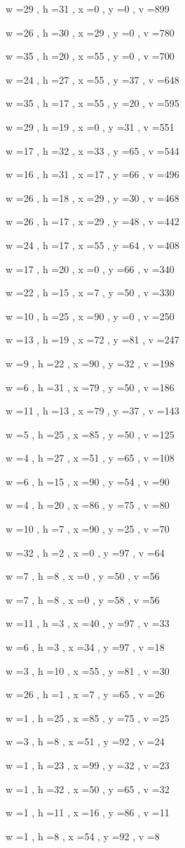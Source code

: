 \documentclass[11pt]{article}
\begin{document}
w =29 , h =31 , x =0 , y =0 , v =899
\par
w =26 , h =30 , x =29 , y =0 , v =780
\par
w =35 , h =20 , x =55 , y =0 , v =700
\par
w =24 , h =27 , x =55 , y =37 , v =648
\par
w =35 , h =17 , x =55 , y =20 , v =595
\par
w =29 , h =19 , x =0 , y =31 , v =551
\par
w =17 , h =32 , x =33 , y =65 , v =544
\par
w =16 , h =31 , x =17 , y =66 , v =496
\par
w =26 , h =18 , x =29 , y =30 , v =468
\par
w =26 , h =17 , x =29 , y =48 , v =442
\par
w =24 , h =17 , x =55 , y =64 , v =408
\par
w =17 , h =20 , x =0 , y =66 , v =340
\par
w =22 , h =15 , x =7 , y =50 , v =330
\par
w =10 , h =25 , x =90 , y =0 , v =250
\par
w =13 , h =19 , x =72 , y =81 , v =247
\par
w =9 , h =22 , x =90 , y =32 , v =198
\par
w =6 , h =31 , x =79 , y =50 , v =186
\par
w =11 , h =13 , x =79 , y =37 , v =143
\par
w =5 , h =25 , x =85 , y =50 , v =125
\par
w =4 , h =27 , x =51 , y =65 , v =108
\par
w =6 , h =15 , x =90 , y =54 , v =90
\par
w =4 , h =20 , x =86 , y =75 , v =80
\par
w =10 , h =7 , x =90 , y =25 , v =70
\par
w =32 , h =2 , x =0 , y =97 , v =64
\par
w =7 , h =8 , x =0 , y =50 , v =56
\par
w =7 , h =8 , x =0 , y =58 , v =56
\par
w =11 , h =3 , x =40 , y =97 , v =33
\par
w =6 , h =3 , x =34 , y =97 , v =18
\par
w =3 , h =10 , x =55 , y =81 , v =30
\par
w =26 , h =1 , x =7 , y =65 , v =26
\par
w =1 , h =25 , x =85 , y =75 , v =25
\par
w =3 , h =8 , x =51 , y =92 , v =24
\par
w =1 , h =23 , x =99 , y =32 , v =23
\par
w =1 , h =32 , x =50 , y =65 , v =32
\par
w =1 , h =11 , x =16 , y =86 , v =11
\par
w =1 , h =8 , x =54 , y =92 , v =8
\par
\newpage
\end{document}
